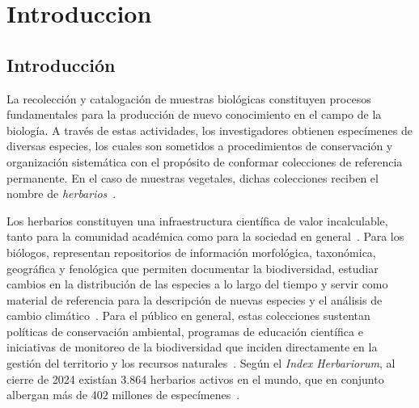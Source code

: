 \chapter{Introduccion}

%

\section{Introducción}

La recolección y catalogación de muestras biológicas constituyen procesos fundamentales
para la producción de nuevo conocimiento en el campo de la biología. A través de estas
actividades, los investigadores obtienen especímenes de diversas especies, los cuales son
sometidos a procedimientos de conservación y organización sistemática con el propósito de
conformar colecciones de referencia permanente. En el caso de muestras vegetales, dichas
colecciones reciben el nombre de \textit{herbarios}~\citep{floridaHerbarium}.

Los herbarios constituyen una infraestructura científica de valor incalculable, tanto para
la comunidad académica como para la sociedad en general~\citep{desmedt2024, domingos2023}.
Para los biólogos, representan repositorios de información morfológica, taxonómica,
geográfica y fenológica que permiten documentar la biodiversidad, estudiar cambios en la
distribución de las especies a lo largo del tiempo y servir como material de referencia para
la descripción de nuevas especies y el análisis de cambio climático~\citep{meineke2018,
heberling2019}. Para el público en general, estas colecciones sustentan políticas de
conservación ambiental, programas de educación científica e iniciativas de monitoreo de la
biodiversidad que inciden directamente en la gestión del territorio y los recursos
naturales~\citep{paton2025}. Según el \textit{Index Herbariorum}, al cierre de 2024
existían 3.864 herbarios activos en el mundo, que en conjunto albergan más de
402 millones de especímenes~\citep{thiers2024}.


